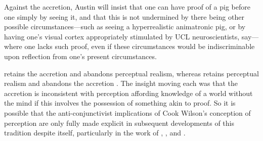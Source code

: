 \documentclass[12pt]{article}
\begin{document}
%
Against the accretion, Austin will insist that one can have proof of a pig before one simply by seeing it, and that this is not undermined by there being other possible circumstances---such as seeing a hyperrealistic animatronic pig, or by having one's visual cortex appropriately stimulated by UCL neuroscientists, say---where one lacks such proof, even if these circumstances would be indiscriminable upon reflection from one's present circumstances.

\citet{Prichard:1938ve} retains the accretion and abandons perceptual realism, whereas \citet{Austin:1962lr} retains perceptual realism and abandons the accretion \citep[see][for discussion]{Kalderon:2010fk}. The insight moving each was that the accretion is inconsistent with perception affording knowledge of a world without the mind if this involves the possession of something akin to proof. So it is possible that the anti-conjunctivist implications of Cook Wilson's conception of perception are only fully made explicit in subsequent developments of this tradition despite itself, particularly in the work of \citet{Prichard:1938ve}, \citet{Austin:1962lr}, and \cite{Hinton:1973js}.


\nocite{Hobbes:1651fk}

 
 
\end{document}
